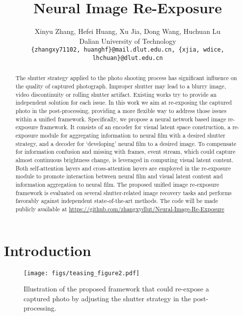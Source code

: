\documentclass[10pt,twocolumn,letterpaper]{article}
\begin{document}
\title{Neural Image Re-Exposure}

\author{Xinyu Zhang, Hefei Huang, Xu Jia, Dong Wang, Huchuan Lu\\
Dalian University of Technology\\
{\tt\small \{zhangxy71102, huanghf\}@mail.dlut.edu.cn,  \{xjia, wdice, lhchuan\}@dlut.edu.cn}
}

\maketitle
\ificcvfinal\thispagestyle{empty}\fi

\begin{abstract}
The shutter strategy applied to the photo shooting process has significant influence on the quality of captured photograph. Improper shutter may lead to a blurry image, video discontinuity or rolling shutter artifact. Existing works try to provide an independent solution for each issue.
In this work we aim at re-exposing the captured photo in the post-processing, providing a more flexible way to address those issues within a unified framework. 
Specifically, we propose a neural network based image re-exposure framework. 
It consists of an encoder for visual latent space construction, a re-exposure module for aggregating information to neural film with a desired shutter strategy, and a decoder for `developing' neural film to a desired image.
To compensate for information confusion and missing with frames, event stream, which could capture almost continuous brightness change, is leveraged in computing visual latent content.
Both self-attention layers and cross-attention layers are employed in the re-exposure module to promote interaction between neural film and visual latent content and information aggregation to neural film.
The proposed unified image re-exposure framework is evaluated on several shutter-related image recovery tasks and performs favorably against independent state-of-the-art methods. The code will be made publicly available at \url{https://github.com/zhangxydlut/Neural-Image-Re-Exposure}




\end{abstract}


\section{Introduction}

\begin{figure}  \centering
	\texttt{[image: figs/teasing\_figure2.pdf]}
	\caption{
Illustration of the proposed framework that could re-expose a captured photo by adjusting the shutter strategy in the post-processing.
	}
	\label{fig:teasing_figure}
\end{figure}
\end{document}
